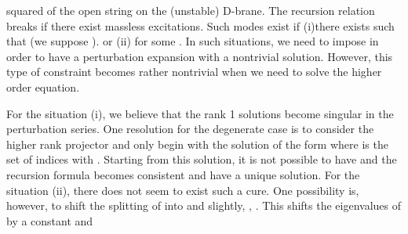 \documentclass[a4paper,aps,preprint,nofootinbib,eqsecnum]{revtex4}
\begin{document}
squared of the open string on the (unstable) D-brane. The recursion relation
breaks if there exist massless excitations. Such modes exist if (i)there
exists \coordHE{} such that \coordHE{} (we suppose \coordHE{}).
or (ii) \coordHE{} for some \coordHE{}. In such
situations, we need to impose \coordHE{}
in order to have a perturbation expansion with a nontrivial solution.
However, this type of constraint becomes rather nontrivial when we need to
solve the higher order equation.

For the situation (i), we believe that the rank 1 solutions become singular
in the perturbation series. One resolution for the degenerate case is to
consider the higher rank projector and only begin with the solution of the
form \coordHE{} where \myHighlight{$%
\Lambda $}\coordHE{} is the set of indices with \coordHE{}. Starting from
this solution, it is not possible to have \coordHE{} and the recursion formula becomes
consistent and have a unique solution. For the situation (ii), there does
not seem to exist such a cure. One possibility is, however, to shift the
splitting of \coordHE{} into \coordHE{} and \myHighlight{$\gamma $}\coordHE{} slightly, \coordHE{}, \coordHE{}. This shifts the eigenvalues of \coordHE{} by a constant and
\end{document}
